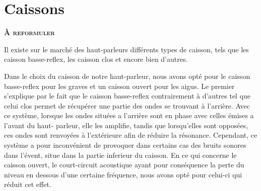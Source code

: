 \section{Caissons}

\textbf{\textsc{À reformuler}}

Il existe sur le marché des haut-parleurs
différents types de caisson, tels que
les caisson basse-reflex, les caisson clos et encore bien d’autres.

Dans le choix du caisson de notre haut-parleur,
nous avons opté pour le caisson basse-reflex pour les graves
et un caisson ouvert pour les aigus.
Le premier s’explique par le fait que le caisson basse-reflex
contrairement à d’autres tel que celui clos permet de récupérer
une partie des ondes se trouvant à l’arrière.
Avec ce système, lorsque les ondes situées a l’arrière sont en phase
avec celles émises a l’avant du haut- parleur, elle les amplifie,
tandis que lorsqu’elles  sont opposées,
ces ondes sont renvoyées à l’extérieure afin de réduire la résonance.
Cependant, ce système a pour inconvénient de provoquer dans certains cas
des bruits sonores dans l’évent, situe dans la partie inferieur du caisson.
En ce qui concerne le caisson ouvert,
le court-circuit acoustique ayant pour conséquence la perte du niveau
en dessous d’une certaine fréquence,
nous avons opté pour celui-ci qui réduit cet effet.
